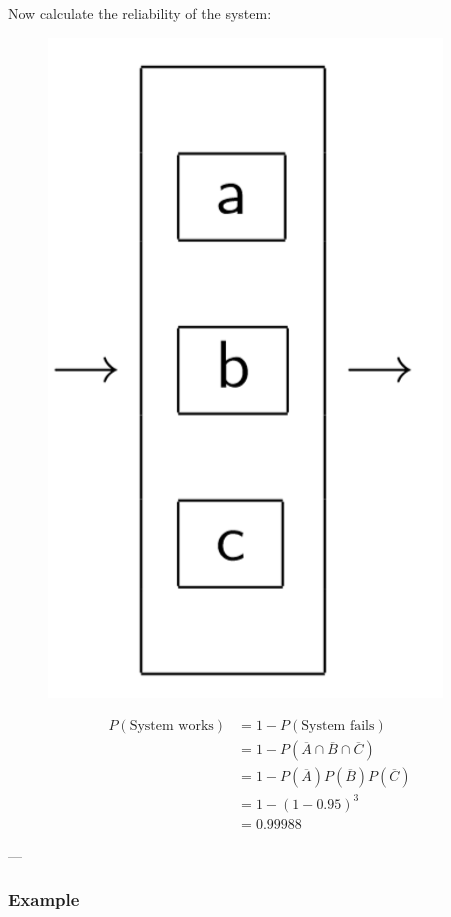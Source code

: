 \documentclass{report}
\begin{document}
Now calculate the reliability of the system:
\begin{figure}[ht!]
\centering
\includegraphics[scale=0.5]{Parallel.png}
\end{figure}
\begin{align*}P(\text{System works}) & = 1- P(\text{System fails}) \\
& = 1 - P(\overline{A} \cap \overline{B} \cap \overline{C}) \\
& = 1 - P(\overline{A})P( \overline{B} )P( \overline{C}) \\
& = 1 - (1-0.95)^3 \\
& = 0.99988 
\end{align*}

---

\subsubsection*{Example}
\end{document}
